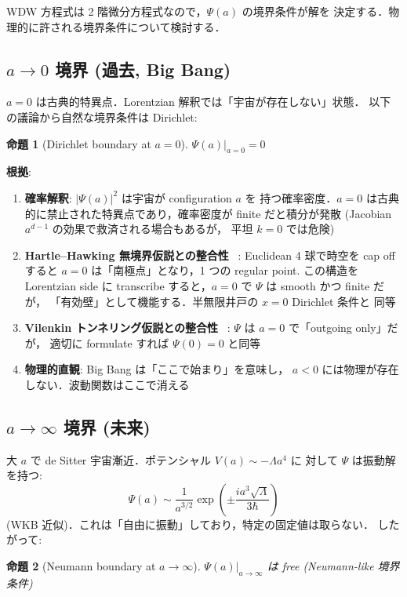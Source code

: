 \documentclass[11pt,a4paper]{article}
\newtheorem{proposition}{命題}
\begin{document}
WDW 方程式は 2 階微分方程式なので，$\Psi(a)$ の境界条件が解を
決定する．物理的に許される境界条件について検討する．

\subsection{$a \to 0$ 境界 (過去, Big Bang)}

$a=0$ は古典的特異点．Lorentzian 解釈では「宇宙が存在しない」状態．
以下の議論から自然な境界条件は Dirichlet:

\begin{proposition}[Dirichlet boundary at $a = 0$]
$\Psi(a)|_{a=0} = 0$
\end{proposition}

\textbf{根拠}:
\begin{enumerate}
\item \textbf{確率解釈}: $|\Psi(a)|^2$ は宇宙が configuration $a$ を
持つ確率密度．$a=0$ は古典的に禁止された特異点であり，確率密度が
finite だと積分が発散 (Jacobian $a^{d-1}$ の効果で救済される場合もあるが，
平坦 $k=0$ では危険)
\item \textbf{Hartle--Hawking 無境界仮説との整合性}
~\cite{HartleHawking1983}: Euclidean 4 球で時空を cap off すると
$a=0$ は「南極点」となり，1 つの regular point. この構造を Lorentzian
side に transcribe すると，$a=0$ で $\Psi$ は smooth かつ finite だが，
「有効壁」として機能する．半無限井戸の $x=0$ Dirichlet 条件と
同等
\item \textbf{Vilenkin トンネリング仮説との整合性}
~\cite{Vilenkin1982}: $\Psi$ は $a=0$ で「outgoing only」だが，
適切に formulate すれば $\Psi(0)=0$ と同等
\item \textbf{物理的直観}: Big Bang は「ここで始まり」を意味し，
$a<0$ には物理が存在しない．波動関数はここで消える
\end{enumerate}

\subsection{$a \to \infty$ 境界 (未来)}

大 $a$ で de Sitter 宇宙漸近．ポテンシャル $V(a) \sim -\Lambda a^4$ に
対して $\Psi$ は振動解を持つ:
\begin{equation}
\Psi(a) \sim \frac{1}{a^{3/2}}\exp\left(\pm\frac{i a^3 \sqrt{\Lambda}}{3\hbar}\right)
\end{equation}
(WKB 近似)．これは「自由に振動」しており，特定の固定値は取らない．
したがって:

\begin{proposition}[Neumann boundary at $a \to \infty$]
$\Psi(a)|_{a\to\infty}$ は free (Neumann-like 境界条件)
\end{proposition}
\end{document}

